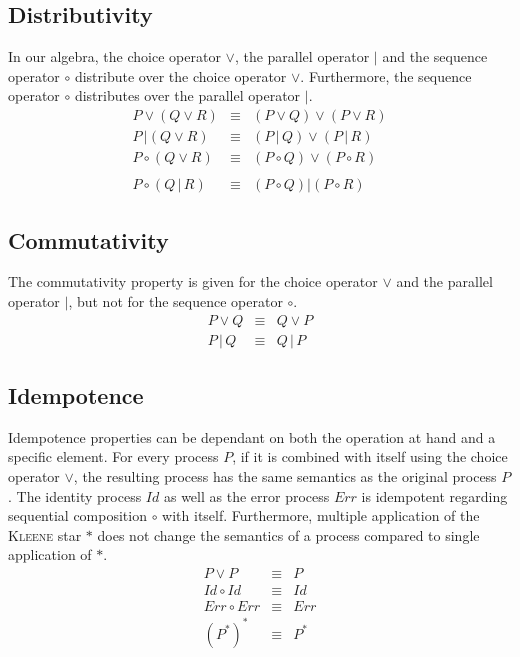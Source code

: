 \subsection{Distributivity}
In our algebra, the choice operator $\vee$, the parallel operator $|$ and the sequence operator $\circ$ distribute over the choice operator $\vee$. Furthermore, the sequence operator $\circ$ distributes over the parallel operator $|$.
\begin{eqnarray*}
  P \vee \left( Q \vee R \right) & \equiv & \left( P \vee Q \right) \vee \left( P \vee R \right) \\
  P \,| \left( Q \vee R \right) & \equiv & \left( P \,|\, Q \right) \vee \left( P \,|\, R \right) \\
  P \circ \left( Q \vee R \right) & \equiv & \left( P \circ Q \right) \vee \left( P \circ R \right) \\
  & & \\
  P \circ \left( Q \,|\, R \right) & \equiv & \left( P \circ Q \right) | \left( P \circ R \right)
\end{eqnarray*}

\subsection{Commutativity}
The commutativity property is given for the choice operator $\vee$ and the parallel operator $|$, but not for the sequence operator $\circ$.
\begin{eqnarray*}
  P \vee Q & \equiv & Q \vee P \\
  P \,|\, Q & \equiv & Q \,|\, P
\end{eqnarray*}

\subsection{Idempotence}
Idempotence properties can be dependant on both the operation at hand and a specific element. For every process $P$, if it is combined with itself using the choice operator $\vee$, the resulting process has the same semantics as the original process $P$. The identity process $Id$ as well as the error process $Err$ is idempotent regarding sequential composition $\circ$ with itself. Furthermore, multiple application of the \textsc{Kleene} star $*$ does not change the semantics of a process compared to single application of $*$.
\begin{eqnarray*}
  P \vee P & \equiv & P \\
  Id \circ Id & \equiv & Id \\
  Err \circ Err & \equiv & Err \\
  (P^*)^* & \equiv & P^*
\end{eqnarray*}

